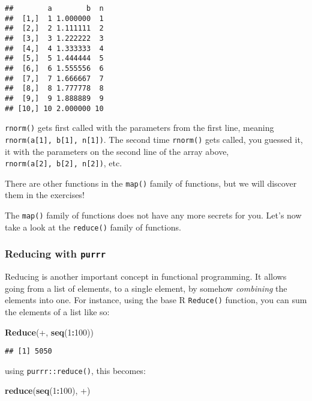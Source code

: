 \documentclass[
]{article}
\newenvironment{Shaded}{\begin{snugshade}}{\end{snugshade}}
\newcommand{\DataTypeTok}[1]{\textcolor[rgb]{0.13,0.29,0.53}{#1}}
\newcommand{\DecValTok}[1]{\textcolor[rgb]{0.00,0.00,0.81}{#1}}
\newcommand{\KeywordTok}[1]{\textcolor[rgb]{0.13,0.29,0.53}{\textbf{#1}}}
\newcommand{\NormalTok}[1]{#1}
\newcommand{\OperatorTok}[1]{\textcolor[rgb]{0.81,0.36,0.00}{\textbf{#1}}}
\newcommand{\StringTok}[1]{\textcolor[rgb]{0.31,0.60,0.02}{#1}}
\begin{document}
\begin{verbatim}
##        a        b  n
##  [1,]  1 1.000000  1
##  [2,]  2 1.111111  2
##  [3,]  3 1.222222  3
##  [4,]  4 1.333333  4
##  [5,]  5 1.444444  5
##  [6,]  6 1.555556  6
##  [7,]  7 1.666667  7
##  [8,]  8 1.777778  8
##  [9,]  9 1.888889  9
## [10,] 10 2.000000 10
\end{verbatim}

\texttt{rnorm()} gets first called with the parameters from the first line, meaning
\texttt{rnorm(a{[}1{]},\ b{[}1{]},\ n{[}1{]})}. The second time \texttt{rnorm()} gets called, you guessed it,
it with the parameters on the second line of the array above,
\texttt{rnorm(a{[}2{]},\ b{[}2{]},\ n{[}2{]})}, etc.

There are other functions in the \texttt{map()} family of functions, but we will discover them in the
exercises!

The \texttt{map()} family of functions does not have any more secrets for you. Let's now take a look at
the \texttt{reduce()} family of functions.

\hypertarget{reducing-with-purrr}{%
\subsubsection{\texorpdfstring{Reducing with \texttt{purrr}}{Reducing with purrr}}\label{reducing-with-purrr}}

Reducing is another important concept in functional programming. It allows going from a list of
elements, to a single element, by somehow \emph{combining} the elements into one. For instance, using
the base R \texttt{Reduce()} function, you can sum the elements of a list like so:

\begin{Shaded}
\begin{Highlighting}[]
\KeywordTok{Reduce}\NormalTok{(}\StringTok{\textasciigrave{}}\DataTypeTok{+}\StringTok{\textasciigrave{}}\NormalTok{, }\KeywordTok{seq}\NormalTok{(}\DecValTok{1}\OperatorTok{:}\DecValTok{100}\NormalTok{))}
\end{Highlighting}
\end{Shaded}

\begin{verbatim}
## [1] 5050
\end{verbatim}

using \texttt{purrr::reduce()}, this becomes:

\begin{Shaded}
\begin{Highlighting}[]
\KeywordTok{reduce}\NormalTok{(}\KeywordTok{seq}\NormalTok{(}\DecValTok{1}\OperatorTok{:}\DecValTok{100}\NormalTok{), }\StringTok{\textasciigrave{}}\DataTypeTok{+}\StringTok{\textasciigrave{}}\NormalTok{)}
\end{Highlighting}
\end{Shaded}
\end{document}
